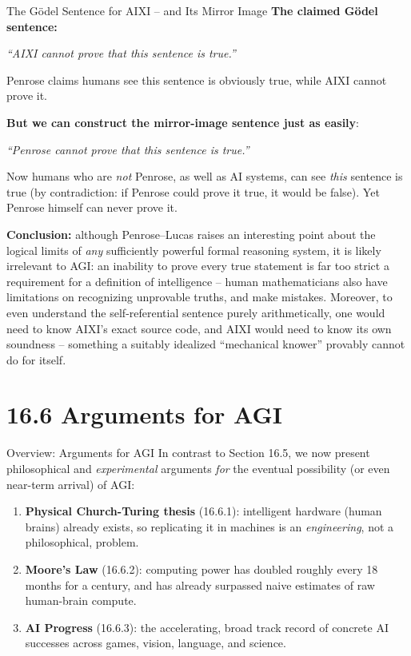 \documentclass[aspectratio=169,10pt]{beamer}
\begin{document}
\begin{frame}{The Gödel Sentence for AIXI -- and Its Mirror Image}
  \textbf{The claimed Gödel sentence:}
  \begin{center}
    \emph{``AIXI cannot prove that this sentence is true.''}
  \end{center}
  Penrose claims humans see this sentence is obviously true, while AIXI
  cannot prove it.

  \vspace{0.4em}
  \textbf{But we can construct the mirror-image sentence just as easily}:
  \begin{center}
    \emph{``Penrose cannot prove that this sentence is true.''}
  \end{center}
  Now humans who are \emph{not} Penrose, as well as AI systems, can see
  \emph{this} sentence is true (by contradiction: if Penrose could prove it
  true, it would be false). Yet Penrose himself can never prove it.

  \vspace{0.4em}
  \textbf{Conclusion:} although Penrose--Lucas raises an interesting point
  about the logical limits of \emph{any} sufficiently powerful formal
  reasoning system, it is likely irrelevant to AGI: an inability to prove
  every true statement is far too strict a requirement for a definition of
  intelligence -- human mathematicians also have limitations on recognizing
  unprovable truths, and make mistakes. Moreover, to even understand the
  self-referential sentence purely arithmetically, one would need to know
  AIXI's exact source code, and AIXI would need to know its own soundness
  -- something a suitably idealized ``mechanical knower'' provably cannot
  do for itself.
\end{frame}

\section{16.6 Arguments for AGI}

\begin{frame}{Overview: Arguments for AGI}
  In contrast to Section 16.5, we now present philosophical and
  \emph{experimental} arguments \emph{for} the eventual possibility (or
  even near-term arrival) of AGI:
  \begin{enumerate}
    \item \textbf{Physical Church-Turing thesis} (16.6.1): intelligent
      hardware (human brains) already exists, so replicating it in machines
      is an \emph{engineering}, not a philosophical, problem.
    \item \textbf{Moore's Law} (16.6.2): computing power has doubled
      roughly every 18 months for a century, and has already surpassed
      naive estimates of raw human-brain compute.
    \item \textbf{AI Progress} (16.6.3): the accelerating, broad track
      record of concrete AI successes across games, vision, language, and
      science.
    \end{enumerate}
\end{frame}
\end{document}
